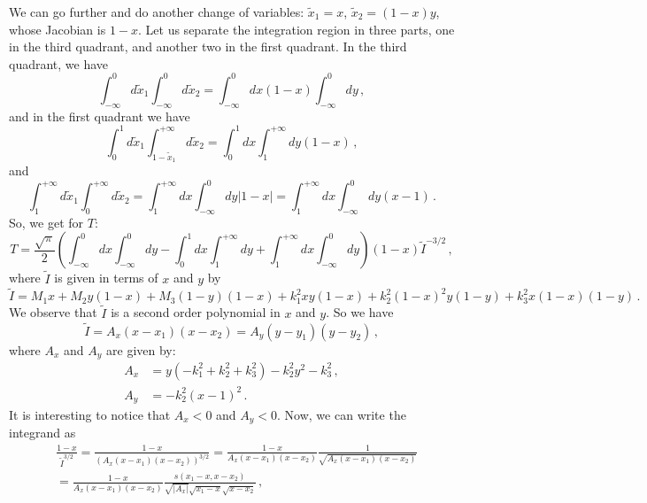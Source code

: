 \documentclass[twoside]{article}
\begin{document}
We can go further and do another change of variables: $\tilde{x}_1 = x$, $\tilde{x}_2 = (1-x)y$, whose Jacobian is $1-x$.
Let us separate the integration region in three parts, one in the third quadrant, and another two in the first quadrant.
In the third quadrant, we have
\begin{equation}
\int_{-\infty}^0 d\tilde{x}_1 \int_{-\infty}^0 d\tilde{x}_2 = \int_{-\infty}^0 dx (1-x)\int_{-\infty}^0 dy  \,,
\end{equation}
and in the first quadrant we have
\begin{equation}
\int_0^1 d\tilde{x}_1 \int_{1-\tilde{x}_1}^{+\infty} d\tilde{x}_2 = \int_0^1 dx \int_1^{+\infty} dy (1-x) \,,
\end{equation}
and
\begin{equation}
\int_1^{+\infty} d\tilde{x}_1 \int_{0}^{+\infty} d\tilde{x}_2 = \int_1^{+\infty} dx \int_{-\infty}^0 dy |1-x| = \int_1^{+\infty} dx \int_{-\infty}^0 dy (x-1) \,.
\end{equation} 
So, we get for $T$:
\begin{equation}
\label{eq:Tdiff}
T =  \frac{\sqrt{\pi}}{2}\left(\int_{-\infty}^0 dx \int_{-\infty}^0 dy 
-\int_0^1 dx \int_{1}^{+\infty}dy
+ \int_{1}^{+\infty} dx \int_{-\infty}^{0}dy\right) (1-x)\tilde{I}^{-3/2}\,, 
\end{equation}
where $\tilde{I}$ is given in terms of $x$ and $y$ by
\begin{equation}
\tilde{I} = M_1 x +  M_2 y (1-x) + M_3 (1-y) (1-x) + k^2_1 x y (1-x) + k^2_2 (1-x)^2 y (1-y) + k^2_3 x (1-x)(1-y) \,.
\end{equation}
We observe that $\tilde{I}$ is a second order polynomial in $x$ and $y$. So we have
\begin{equation}
\tilde{I} = A_x (x-x_1)(x-x_2) = A_y (y-y_1)(y-y_2)\,,
\end{equation}
where $A_x$ and $A_y$ are given by:
\begin{align}
A_x &= y (-k_1^2+k_2^2+k_3^2)- k_2^2 y^2-k_3^2\,,\\
A_y &= -k_2^2 (x-1)^2\,.
\end{align}
It is interesting to notice that $A_x<0$ and $A_y<0$.
Now, we can write the integrand as
\begin{equation}
\begin{split}
&\frac{1-x}{\tilde{I}^{3/2}}=\frac{1-x}{(A_x (x-x_1)(x-x_2))^{3/2}}=\frac{1-x}{A_x (x-x_1)(x-x_2)}\frac{1}{\sqrt{A_x (x-x_1)(x-x_2)}}\\
&=\frac{1-x}{A_x (x-x_1)(x-x_2)}\frac{s(x_1-x,x-x_2)}{\sqrt{|A_x|}\sqrt{x_1-x}\sqrt{x-x_2}}\,,
\end{split}
\end{equation}
\end{document}
